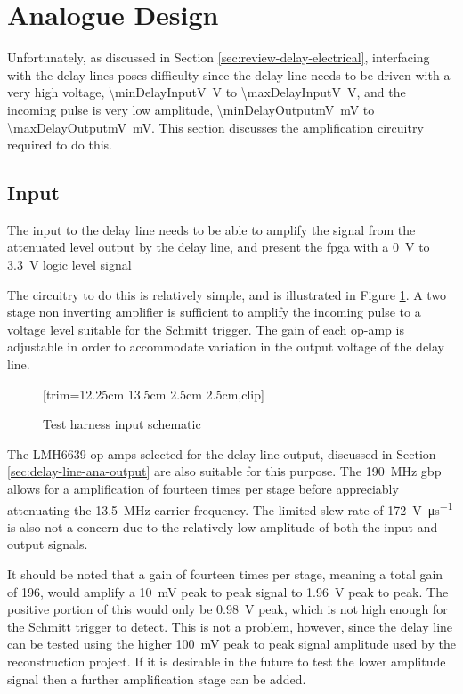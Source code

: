 \section{Analogue Design}  \label{sec:test-harness-ana}

Unfortunately, as discussed in Section \ref{sec:review-delay-electrical}, interfacing with the delay lines poses difficulty since the delay line needs to be driven with a very high voltage, \SI{\minDelayInputV}{\volt} to \SI{\maxDelayInputV}{\volt}, and the incoming pulse is very low amplitude, \SI{\minDelayOutputmV}{\milli\volt} to \SI{\maxDelayOutputmV}{\milli\volt}. This section discusses the amplification circuitry required to do this.

\subsection{Input}

The input to the delay line needs to be able to amplify the signal from the attenuated level output by the delay line, and present the \gls{fpga} with a \SI{0}{\volt} to \SI{3.3}{\volt} logic level signal

The circuitry to do this is relatively simple, and is illustrated in Figure \ref{fig:test-harness-input-sch}. A two stage non inverting amplifier is sufficient to amplify the incoming pulse to a voltage level suitable for the Schmitt trigger. The gain of each op-amp is adjustable in order to accommodate variation in the output voltage of the delay line.

\begin{figure}[ht]
	\centering
	[trim={12.25cm 13.5cm 2.5cm 2.5cm},clip] %
	\caption{Test harness input schematic}
	\label{fig:test-harness-input-sch}
\end{figure}

The LMH6639 op-amps selected for the delay line output, discussed in Section \ref{sec:delay-line-ana-output} are also suitable for this purpose. The \SI{190}{\mega\hertz} \gls{gbp} allows for a amplification of fourteen times per stage before appreciably attenuating the \SI{13.5}{\mega\hertz} carrier frequency. The limited slew rate of \SI{172}{\volt\per\micro\second} is also not a concern due to the relatively low amplitude of both the input and output signals.

It should be noted that a gain of fourteen times per stage, meaning a total gain of 196, would amplify a \SI{10}{\milli\volt} peak to peak signal to \SI{1.96}{\volt} peak to peak. The positive portion of this would only be \SI{0.98}{\volt} peak, which is not high enough for the Schmitt trigger to detect. This is not a problem, however, since the delay line can be tested using the higher \SI{100}{\milli\volt} peak to peak signal amplitude used by the reconstruction project. If it is desirable in the future to test the lower amplitude signal then a further amplification stage can be added.

